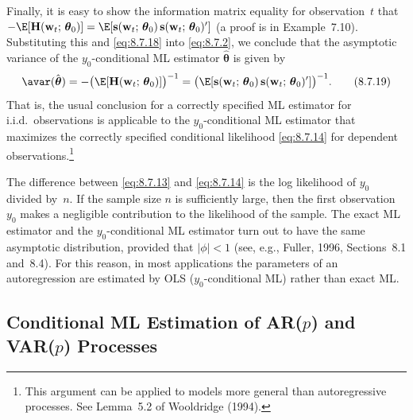 Finally, it is easy to show the information matrix equality for observation~$t$ that
$-\E[\mathbf{H}(\mathbf{w}_t;\, \boldsymbol{\theta}_0)]
= \E[\mathbf{s}(\mathbf{w}_t;\, \boldsymbol{\theta}_0)\,\mathbf{s}(\mathbf{w}_t;\, \boldsymbol{\theta}_0)']$
(a proof is in Example~7.10). Substituting this and \eqref{eq:8.7.18} into \eqref{eq:8.7.2}, we conclude that the asymptotic variance of the
$y_0$-conditional ML estimator $\hat{\boldsymbol{\theta}}$ is given by
\begin{equation}
  \avar(\hat{\boldsymbol{\theta}})
  = -\bigl(\E[\mathbf{H}(\mathbf{w}_t;\, \boldsymbol{\theta}_0)]\bigr)^{-1}
  = \bigl(\E[\mathbf{s}(\mathbf{w}_t;\, \boldsymbol{\theta}_0)\,
    \mathbf{s}(\mathbf{w}_t;\, \boldsymbol{\theta}_0)']\bigr)^{-1}.
  \label{eq:8.7.19} \tag{8.7.19}
\end{equation}
That is, the usual conclusion for a correctly specified ML estimator for i.i.d.\ observations is applicable to the $y_0$-conditional ML estimator that maximizes the correctly specified conditional likelihood \eqref{eq:8.7.14} for dependent observations.\footnote{This argument can be applied to models more general than autoregressive processes. See Lemma~5.2 of
Wooldridge (1994).}

The difference between \eqref{eq:8.7.13} and \eqref{eq:8.7.14} is the log likelihood of $y_0$ divided
by~$n$. If the sample size $n$ is sufficiently large, then the first observation $y_0$ makes a
negligible contribution to the likelihood of the sample. The exact ML estimator and
the $y_0$-conditional ML estimator turn out to have the same asymptotic distribution,
provided that $|\phi| < 1$ (see, e.g., Fuller, 1996, Sections~8.1 and~8.4). For this
reason, in most applications the parameters of an autoregression are estimated by
OLS ($y_0$-conditional ML) rather than exact ML.

\subsection*{Conditional ML Estimation of AR(\texorpdfstring{$p$}{p}) and VAR(\texorpdfstring{$p$}{p}) Processes}


